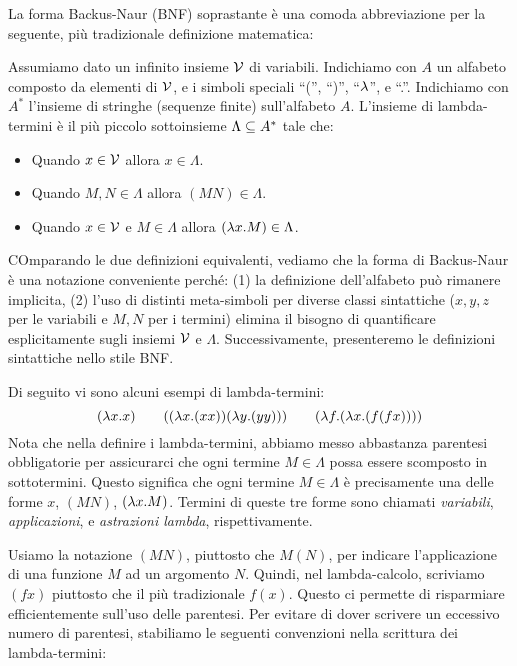 \documentclass{article}
\begin{document}
La forma Backus-Naur (BNF) soprastante \`e una comoda abbreviazione per
la seguente, pi\`u tradizionale definizione matematica:

\begin{definition}
  Assumiamo dato un infinito insieme ${\cal V}$ di variabili. Indichiamo con $A$ un
  alfabeto composto da elementi di ${\cal V}$, e i simboli
  speciali ``('', ``)'', ``$\lambda$'', e ``.''. Indichiamo con $A^*$ l'insieme di
  stringhe (sequenze finite) sull'alfabeto $A$. L'insieme di
  lambda-termini \`e il pi\`u piccolo sottoinsieme $\Lambda\subseteq A^*$ tale che:
  \begin{itemize}
  \item Quando $x\in{\cal V}$ allora $x\in\Lambda$.
  \item Quando $M,N\in\Lambda$ allora $(MN)\in\Lambda$.
  \item Quando $x\in{\cal V}$ e $M\in\Lambda$ allora $(\lambda x.M)\in\Lambda$.
  \end{itemize}
\end{definition}

COmparando le due definizioni equivalenti, vediamo che la
forma di Backus-Naur \`e una notazione conveniente perché: (1) la definizione
dell'alfabeto pu\`o rimanere implicita, (2) l'uso di distinti meta-simboli
per diverse classi sintattiche ($x,y,z$ per le variabili e $M,N$ per
i termini) elimina il bisogno di quantificare esplicitamente sugli insiemi 
${\cal V}$ e $\Lambda$. Successivamente, presenteremo le 
definizioni sintattiche nello stile BNF.

Di seguito vi sono alcuni esempi di lambda-termini:
\[ (\lambda x.x) \hspace{2em} ((\lambda x.(xx))(\lambda y.(yy))) \hspace{2em} (\lambda f.(\lambda x.(f(fx))))
\]
Nota che nella definire i lambda-termini, abbiamo messo abbastanza
parentesi obbligatorie per assicurarci che ogni termine $M\in\Lambda$ possa essere
scomposto in sottotermini. Questo significa che ogni termine $M\in\Lambda$
\`e precisamente una delle forme $x$, $(MN)$, $(\lambda x.M)$. Termini di
queste tre forme sono chiamati {\em variabili}, {\em applicazioni}, e 
{\em astrazioni lambda}, rispettivamente.

Usiamo la notazione $(MN)$, piuttosto che $M(N)$, per indicare
l'applicazione di una funzione $M$ ad un argomento $N$. Quindi, nel
lambda-calcolo, scriviamo $(fx)$ piuttosto che il pi\`u tradizionale $f(x)$. Questo
ci permette di risparmiare efficientemente sull'uso delle parentesi.
Per evitare di dover scrivere un eccessivo numero di parentesi, stabiliamo
le seguenti convenzioni nella scrittura dei lambda-termini:
\end{document}
